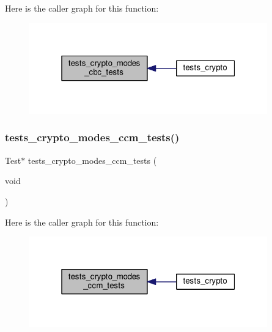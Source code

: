 Here is the caller graph for this function\+:
\nopagebreak
\begin{figure}[H]
\begin{center}
\leavevmode
\includegraphics[width=292pt]{group__unittests_gada776e0b50a5f95f2f3eb86d94d83791_icgraph}
\end{center}
\end{figure}
\mbox{\label{group__unittests_gadf1db8c6d373f13fccc185fdf2b43be6}} 
\subsubsection{\texorpdfstring{tests\+\_\+crypto\+\_\+modes\+\_\+ccm\+\_\+tests()}{tests\_crypto\_modes\_ccm\_tests()}}
{\footnotesize\ttfamily Test$\ast$ tests\+\_\+crypto\+\_\+modes\+\_\+ccm\+\_\+tests (\begin{DoxyParamCaption}\item[{void}]{ }\end{DoxyParamCaption})}

Here is the caller graph for this function\+:
\nopagebreak
\begin{figure}[H]
\begin{center}
\leavevmode
\includegraphics[width=292pt]{group__unittests_gadf1db8c6d373f13fccc185fdf2b43be6_icgraph}
\end{center}
\end{figure}
\mbox{\label{group__unittests_ga504b19a263d14508528b1c378a3edee5}} 
